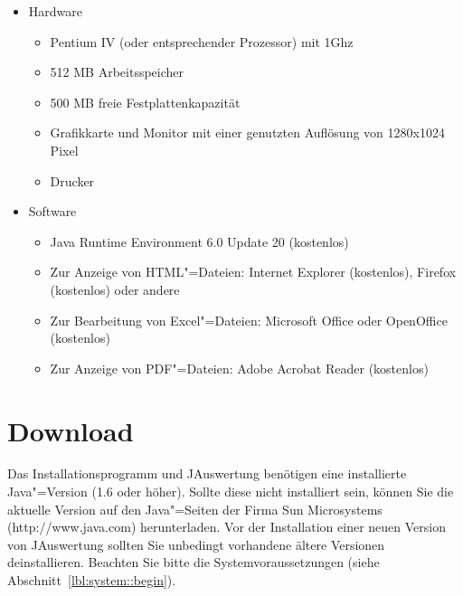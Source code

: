 \documentclass[11pt,a4paper,twoside,ngerman]{article}
\begin{document}
\begin{itemize}

\item Hardware
\begin{itemize}

\item Pentium IV (oder entsprechender Prozessor) mit 1Ghz


\item 512 MB Arbeitsspeicher


\item 500 MB freie Festplattenkapazität


\item Grafikkarte und Monitor mit einer genutzten Auflösung von 1280x1024 Pixel


\item Drucker


\end{itemize}



\item Software
\begin{itemize}

\item Java Runtime Environment 6.0 Update 20 (kostenlos)


\item Zur Anzeige von HTML"=Dateien: Internet Explorer (kostenlos), Firefox (kostenlos) oder andere


\item Zur Bearbeitung von Excel"=Dateien: Microsoft Office oder OpenOffice (kostenlos)


\item Zur Anzeige von PDF"=Dateien: Adobe Acrobat Reader (kostenlos)


\end{itemize}



\end{itemize}

\newpage

\section{Download}
\label{lbl:download::begin}
Das Installationsprogramm und JAuswertung benötigen eine installierte Java"=Version (1.6 oder höher). Sollte diese nicht installiert sein, können Sie die aktuelle Version auf den Java"=Seiten der Firma Sun Microsystems (http://www.java.com) herunterladen. Vor der Installation einer neuen Version von JAuswertung sollten Sie unbedingt vorhandene ältere Versionen deinstallieren. Beachten Sie bitte die Systemvoraussetzungen (siehe Abschnitt~\ref{lbl:system::begin}).
\end{document}
